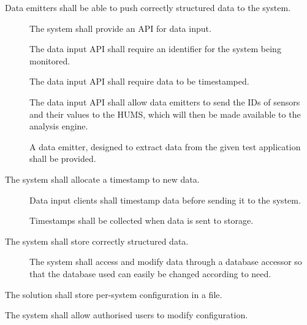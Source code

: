 \begin{description}[leftmargin=2cm]
  	\item[\fr{1}]  Data emitters shall be able to push correctly structured data 	to the system.
	\begin{description}
		 \item[] The system shall provide an API for data input.

		  \item[] The data input API shall require an identifier for
 		 the system being monitored.

 		 \item[] The data input API shall require data to be
 		 timestamped.

 		 \item[] The data input API shall allow data emitters
 		 to send the IDs of sensors and their values to the HUMS, which will 		then be made available to the analysis engine.

 		 \item[] A data emitter, designed to extract data from the given 		test application shall be provided.
	\end{description}
	\item[\fr{2}]  The system shall allocate a timestamp to new data.
		\begin{description}
	 		 \item[]Data input clients shall timestamp data before
 			 sending it to the system.
 			 \item[] Timestamps shall be collected when data is sent 			to storage.
		 \end{description}
	 \item[\fr{3}] The system shall store correctly structured data.
	 	\begin{description}
	 		\item[] The system shall access and modify data 				through a database accessor so that the database used can 			easily be changed according to need.
	  \end{description}

 \item[\fr{4.1}] The solution shall store per-system configuration in
 a file.

 \item[\fr{4.2}] The system shall allow authorised users to modify
 configuration. 
\end{description}

